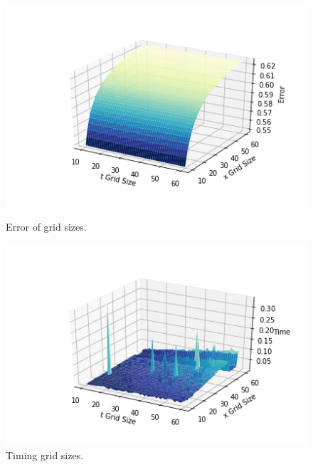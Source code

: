 \documentclass[12pt, oneside]{book}
\theoremstyle{plain}
\theoremstyle{definition}
\begin{document}
\begin{figure}[!htb]
  \begin{minipage}[b]{0.5\textwidth}
    \includegraphics[width=\textwidth]{HeatExplicitGridError.png}
    \caption{Error of grid sizes.}
  \end{minipage}
  \begin{minipage}[b]{0.5\textwidth}
    \includegraphics[width=\textwidth]{HeatExplicitGridTimer.png}
    \caption{Timing grid sizes.}
  \end{minipage}
\end{figure}
\end{document}
